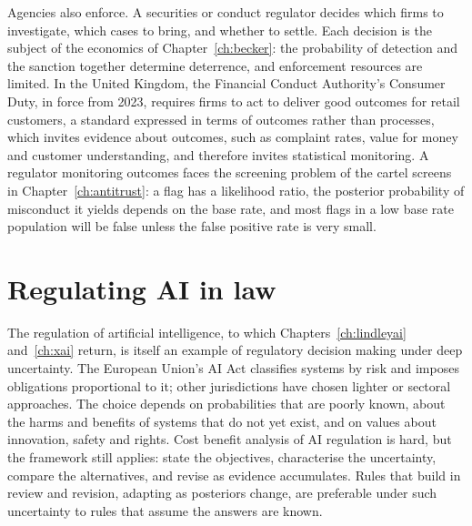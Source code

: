 Agencies also enforce. A securities or conduct regulator decides which firms to investigate, which cases to bring, and whether to settle. Each decision is the subject of the economics of Chapter~\ref{ch:becker}: the probability of detection and the sanction together determine deterrence, and enforcement resources are limited. In the United Kingdom, the Financial Conduct Authority's Consumer Duty, in force from 2023, requires firms to act to deliver good outcomes for retail customers, a standard expressed in terms of outcomes rather than processes, which invites evidence about outcomes, such as complaint rates, value for money and customer understanding, and therefore invites statistical monitoring. A regulator monitoring outcomes faces the screening problem of the cartel screens in Chapter~\ref{ch:antitrust}: a flag has a likelihood ratio, the posterior probability of misconduct it yields depends on the base rate, and most flags in a low base rate population will be false unless the false positive rate is very small.

\section{Regulating AI in law}

The regulation of artificial intelligence, to which Chapters~\ref{ch:lindleyai} and~\ref{ch:xai} return, is itself an example of regulatory decision making under deep uncertainty. The European Union's AI Act \citep{euaiact2024} classifies systems by risk and imposes obligations proportional to it; other jurisdictions have chosen lighter or sectoral approaches. The choice depends on probabilities that are poorly known, about the harms and benefits of systems that do not yet exist, and on values about innovation, safety and rights. Cost benefit analysis of AI regulation is hard, but the framework still applies: state the objectives, characterise the uncertainty, compare the alternatives, and revise as evidence accumulates. Rules that build in review and revision, adapting as posteriors change, are preferable under such uncertainty to rules that assume the answers are known.

